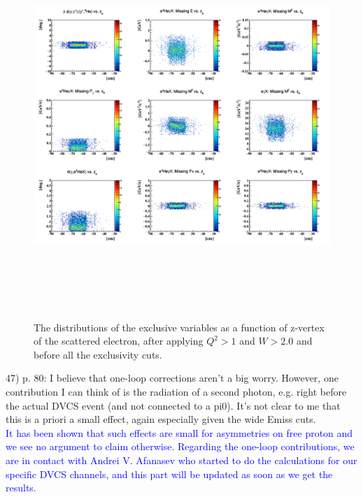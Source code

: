  \begin{figure}[h!]
 \centering
 \includegraphics[height=14.5cm]{fig/exclusivity_zele.png}
 \caption{The distributions of the exclusive variables as a function of 
    z-vertex of the scattered electron, after applying $Q^{2}>1$ and $W>2.0$ 
 and before all the exclusivity cuts.}
 \label{fig:exclusive_z}
 \end{figure}


47) p. 80: I believe that one-loop corrections aren't a big worry. However, one 
contribution I can think of is the radiation of a second photon, e.g. right 
before the actual DVCS event (and not connected to a pi0). It's not clear to me 
that this is a priori a small effect, again especially given the wide Emiss 
cuts. \\
\textcolor{blue}{It has been shown that such effects are small for asymmetries
on free proton and we see no argument to claim otherwise. Regarding the 
one-loop contributions, we are in contact with Andrei V. Afanasev who started 
to do the calculations for our specific DVCS channels, and this part will be 
updated as soon as we get the results.}\\

